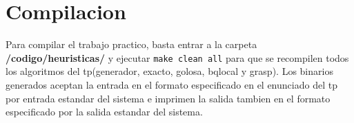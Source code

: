 \section{Compilacion}
Para compilar el trabajo practico, basta entrar a la carpeta \textbf{/codigo/heuristicas/} y ejecutar \texttt{make clean all} para que se recompilen todos los algoritmos del tp(generador, exacto, golosa, bqlocal y grasp). Los binarios generados aceptan la entrada en el formato especificado en el enunciado del tp por entrada estandar del sistema e imprimen la salida tambien en el formato especificado por la salida estandar del sistema.